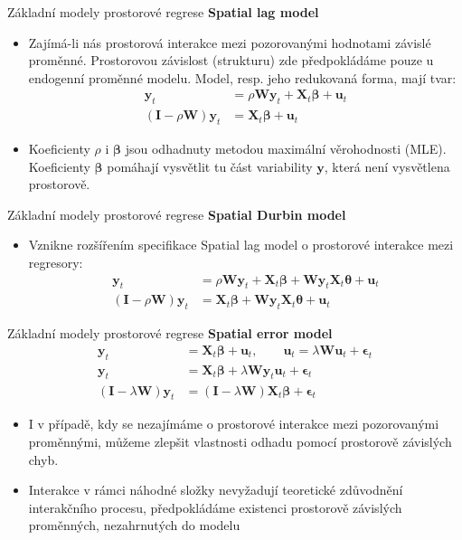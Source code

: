 \documentclass{beamer}
\begin{document}
\begin{frame}{Základní modely prostorové regrese}
\textbf{Spatial lag model}
\begin{itemize}
	\item Zajímá-li nás prostorová interakce mezi pozorovanými hodnotami závislé proměnné. Prostorovou závislost (strukturu) zde předpokládáme pouze u endogenní proměnné modelu. Model, resp. jeho redukovaná forma, mají tvar: 
	\begin{align*}
	\bm{y}_t & = \rho \bm{Wy}_t + \bm{X}_t\bm{\beta}+ \bm{u}_t\\
	(\bm{I} - \rho \bm{W}) \bm{y}_t & = \bm{X}_t \bm{\beta} + \bm{u}_t
	\end{align*}
	\item Koeficienty $\rho$ i $\bm{\beta}$ jsou odhadnuty metodou maximální věrohodnosti (MLE). Koeficienty  $\bm{\beta}$  pomáhají vysvětlit tu část variability $\bm{y}$, která není vysvětlena prostorově.	
\end{itemize}
\end{frame}
\begin{frame}{Základní modely prostorové regrese}
\textbf{Spatial Durbin model}
\begin{itemize}
	\item Vznikne rozšířením specifikace Spatial lag model o prostorové interakce mezi regresory: 
		\begin{align*}
		\bm{y}_t & = \rho \bm{Wy}_t + \bm{X}_t\bm{\beta}+ \bm{Wy}_t\bm{X}_t\bm{\theta} +  \bm{u}_t\\
		(\bm{I} - \rho \bm{W}) \bm{y}_t & = \bm{X}_t \bm{\beta} + \bm{Wy}_t\bm{X}_t\bm{\theta}+ \bm{u}_t
		\end{align*}
\end{itemize}
\end{frame}
\begin{frame}{Základní modely prostorové regrese}
\textbf{Spatial error model}
	\begin{align*}
	\bm{y}_t & =   \bm{X}_t\bm{\beta}+  \bm{u}_t, \qquad \bm{u}_t = \lambda  \bm{Wu}_t + \bm{\epsilon}_t\\
	\bm{y}_t & = \bm{X}_t\bm{\beta}+ \lambda\bm{Wy}_t\bm{u}_t+  \bm{\epsilon}_t\\
	(\bm{I} - \lambda \bm{W}) \bm{y}_t & = (\bm{I} - \lambda \bm{W}) \bm{X}_t \bm{\beta} + \bm{\epsilon}_t
	\end{align*}
\begin{itemize}

	\item I v případě, kdy se nezajímáme o prostorové interakce mezi pozorovanými proměnnými, můžeme zlepšit vlastnosti odhadu pomocí prostorově závislých chyb.
	\item Interakce v rámci náhodné složky nevyžadují teoretické zdůvodnění interakčního procesu, předpokládáme existenci prostorově závislých proměnných, nezahrnutých do modelu
\end{itemize}
\end{frame}
\end{document}
